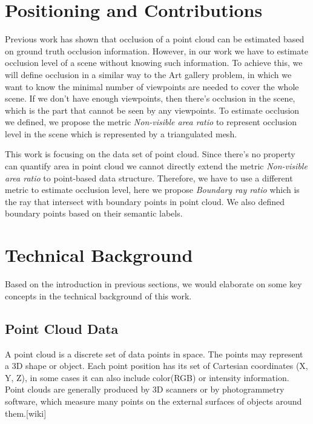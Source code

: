 \documentclass[11pt, a4paper,oneside,chapterprefix=false]{scrbook}
\begin{document}
\section{Positioning and Contributions}

Previous work has shown that occlusion of a point cloud can be estimated based on ground truth occlusion information. However, in our work we have to estimate occlusion level of a scene without knowing such information. To achieve this, we will define 
occlusion in a similar way to the Art gallery problem, in which we want to know the minimal number of viewpoints are needed to cover the whole scene. If we don't have enough viewpoints, then there's occlusion in the scene, which is the part that cannot be seen by any viewpoints. To estimate occlusion we defined, we propose the metric \textit{Non-visible area ratio} to represent occlusion level in the scene which is represented by a triangulated mesh. 

\vspace{10pt}

This work is focusing on the data set of point cloud. Since there's no property can quantify area in point cloud we cannot directly extend the metric \textit{Non-visible area ratio} to point-based data structure. Therefore, we have to use a different metric to estimate occlusion level, here we propose \textit{Boundary ray ratio} which is the ray that intersect with boundary points in point cloud. We also defined boundary points based on their semantic labels.

\section{Technical Background}

Based on the introduction in previous sections, we would elaborate on some key concepts in the technical background of this work.

\subsection{Point Cloud Data}

A point cloud is a discrete set of data points in space. The points may represent a 3D shape or object. Each point position has its set of Cartesian coordinates (X, Y, Z), in some cases it can also include color(RGB) or intensity information. Point clouds are generally produced by 3D scanners or by photogrammetry software, which measure many points on the external surfaces of objects around them.[wiki] 
\end{document}

